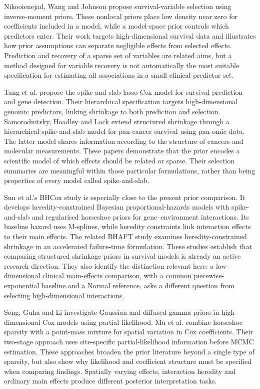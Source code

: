 Nikooienejad, Wang and Johnson \cite{ref6} propose survival-variable selection using inverse-moment priors. These nonlocal priors place low density near zero for coefficients included in a model, while a model-space prior controls which predictors enter. Their work targets high-dimensional survival data and illustrates how prior assumptions can separate negligible effects from selected effects. Prediction and recovery of a sparse set of variables are related aims, but a method designed for variable recovery is not automatically the most suitable specification for estimating all associations in a small clinical predictor set.

Tang et al. \cite{ref25} propose the spike-and-slab lasso Cox model for survival prediction and gene detection. Their hierarchical specification targets high-dimensional genomic predictors, linking shrinkage to both prediction and selection. Samorodnitsky, Hoadley and Lock \cite{ref42} extend structured shrinkage through a hierarchical spike-and-slab model for pan-cancer survival using pan-omic data. The latter model shares information according to the structure of cancers and molecular measurements. These papers demonstrate that the prior encodes a scientific model of which effects should be related or sparse. Their selection summaries are meaningful within those particular formulations, rather than being properties of every model called spike-and-slab.

Sun et al.'s BHCox study \cite{ref52} is especially close to the present prior comparison. It develops heredity-constrained Bayesian proportional-hazards models with spike-and-slab and regularised horseshoe priors for gene--environment interactions. Its baseline hazard uses M-splines, while heredity constraints link interaction effects to their main effects. The related BHAFT study \cite{ref68} examines heredity-constrained shrinkage in an accelerated failure-time formulation. These studies establish that comparing structured shrinkage priors in survival models is already an active research direction. They also identify the distinction relevant here: a low-dimensional clinical main-effects comparison, with a common piecewise-exponential baseline and a Normal reference, asks a different question from selecting high-dimensional interactions.

Song, Guha and Li \cite{ref94} investigate Gaussian and diffused-gamma priors in high-dimensional Cox models using partial likelihood. Mu et al. \cite{ref95} combine horseshoe sparsity with a point-mass mixture for spatial variation in Cox coefficients. Their two-stage approach uses site-specific partial-likelihood information before MCMC estimation. These approaches broaden the prior literature beyond a single type of sparsity, but also show why likelihood and coefficient structure must be specified when comparing findings. Spatially varying effects, interaction heredity and ordinary main effects produce different posterior interpretation tasks.

